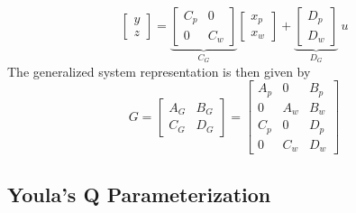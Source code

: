 \begin{examplesection}
    \begin{equation*}
        \begin{bmatrix}
            y \\
            z
        \end{bmatrix}
        = \underbrace{\begin{bmatrix}
                C_p & 0   \\
                0   & C_w
            \end{bmatrix}}_{C_G}
        \begin{bmatrix}
            x_p \\
            x_w
        \end{bmatrix}
        +
        \underbrace{\begin{bmatrix}
                D_p \\
                D_w
            \end{bmatrix}}_{D_G}
        \: u
    \end{equation*}
    The generalized system representation is then given by
    \begin{equation*}
        G = \left[
            \begin{array}{c|c} %
                A_G & B_G \\
                \hline %
                C_G & D_G
            \end{array}
            \right]
        =
        \left[
            \begin{array}{cc|c} %
                A_p & 0   & B_p \\
                0   & A_w & B_w \\
                \hline %
                C_p & 0   & D_p \\
                0   & C_w & D_w
            \end{array}
            \right]
    \end{equation*}

\end{examplesection}

\subsection{Youla's Q Parameterization}

